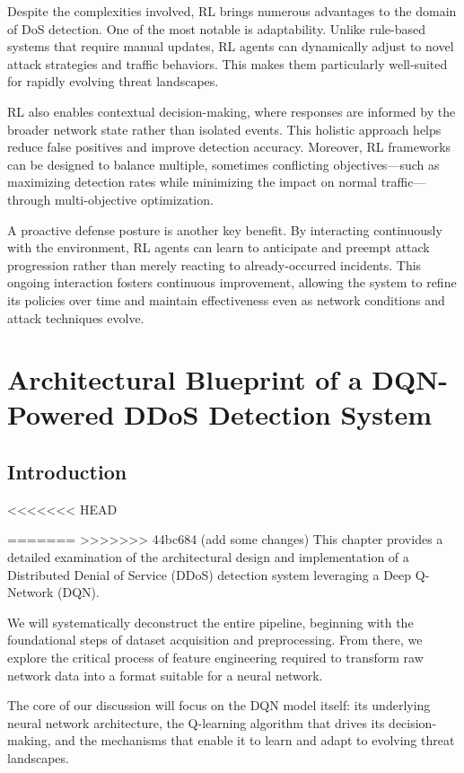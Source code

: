 \documentclass{report}
\begin{document}
Despite the complexities involved, RL brings numerous advantages to the domain of DoS detection. One of the most notable is adaptability. Unlike rule-based systems that require manual updates, RL agents can dynamically adjust to novel attack strategies and traffic behaviors. This makes them particularly well-suited for rapidly evolving threat landscapes.

RL also enables contextual decision-making, where responses are informed by the broader network state rather than isolated events. This holistic approach helps reduce false positives and improve detection accuracy. Moreover, RL frameworks can be designed to balance multiple, sometimes conflicting objectives—such as maximizing detection rates while minimizing the impact on normal traffic—through multi-objective optimization.

A proactive defense posture is another key benefit. By interacting continuously with the environment, RL agents can learn to anticipate and preempt attack progression rather than merely reacting to already-occurred incidents. This ongoing interaction fosters continuous improvement, allowing the system to refine its policies over time and maintain effectiveness even as network conditions and attack techniques evolve.

\chapter{Architectural Blueprint of a DQN-Powered DDoS Detection System}
\section{Introduction}
<<<<<<< HEAD

=======
>>>>>>> 44bc684 (add some changes)
This chapter provides a detailed examination of the architectural design and implementation of a Distributed Denial of Service (DDoS) detection system leveraging a Deep Q-Network (DQN).

We will systematically deconstruct the entire pipeline, beginning with the foundational steps of dataset acquisition and preprocessing. From there, we explore the critical process of feature engineering required to transform raw network data into a format suitable for a neural network.

The core of our discussion will focus on the DQN model itself: its underlying neural network architecture, the Q-learning algorithm that drives its decision-making, and the mechanisms that enable it to learn and adapt to evolving threat landscapes.
\end{document}
